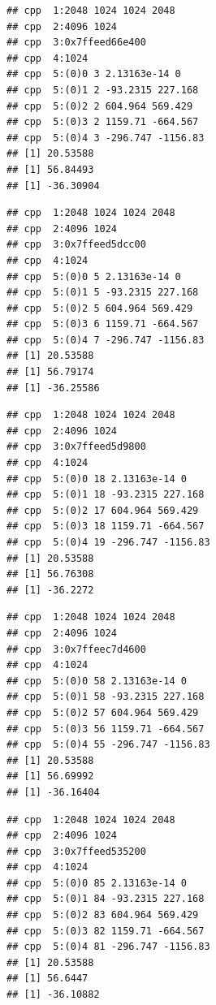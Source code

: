 \documentclass[10pt]{article}\usepackage[]{graphicx}\usepackage[]{color}
\makeatletter
\newenvironment{kframe}{%
 \def\at@end@of@kframe{}%
 \ifinner\ifhmode%
  \def\at@end@of@kframe{\end{minipage}}%
  \begin{minipage}{\columnwidth}%
 \fi\fi%
 \def\FrameCommand##1{\hskip\@totalleftmargin \hskip-\fboxsep
 \colorbox{shadecolor}{##1}\hskip-\fboxsep
     \hskip-\linewidth \hskip-\@totalleftmargin \hskip\columnwidth}%
 \MakeFramed {\advance\hsize-\width
   \@totalleftmargin\z@ \linewidth\hsize
   \@setminipage}}%
 {\par\unskip\endMakeFramed%
 \at@end@of@kframe}
\newenvironment{knitrout}{}{} %
\makeatother
\begin{document}
\begin{knitrout}
\begin{kframe}
{\ttfamily\noindent\itshape\color{messagecolor}{\#\# f creation}}\begin{verbatim}
## cpp  1:2048 1024 1024 2048
## cpp  2:4096 1024
## cpp  3:0x7ffeed66e400
## cpp  4:1024
## cpp  5:(0)0 3 2.13163e-14 0
## cpp  5:(0)1 2 -93.2315 227.168
## cpp  5:(0)2 2 604.964 569.429
## cpp  5:(0)3 2 1159.71 -664.567
## cpp  5:(0)4 3 -296.747 -1156.83
## [1] 20.53588
## [1] 56.84493
## [1] -36.30904
\end{verbatim}


{\ttfamily\noindent\itshape\color{messagecolor}{\#\# Stage\ \ 1 est. (Ave. S.V.R. -11.2 dB) \\\#\# f creation}}\begin{verbatim}
## cpp  1:2048 1024 1024 2048
## cpp  2:4096 1024
## cpp  3:0x7ffeed5dcc00
## cpp  4:1024
## cpp  5:(0)0 5 2.13163e-14 0
## cpp  5:(0)1 5 -93.2315 227.168
## cpp  5:(0)2 5 604.964 569.429
## cpp  5:(0)3 6 1159.71 -664.567
## cpp  5:(0)4 7 -296.747 -1156.83
## [1] 20.53588
## [1] 56.79174
## [1] -36.25586
\end{verbatim}


{\ttfamily\noindent\itshape\color{messagecolor}{\#\# Stage\ \ 2 est. (Ave. S.V.R. -20.4 dB) \\\#\# f creation}}\begin{verbatim}
## cpp  1:2048 1024 1024 2048
## cpp  2:4096 1024
## cpp  3:0x7ffeed5d9800
## cpp  4:1024
## cpp  5:(0)0 18 2.13163e-14 0
## cpp  5:(0)1 18 -93.2315 227.168
## cpp  5:(0)2 17 604.964 569.429
## cpp  5:(0)3 18 1159.71 -664.567
## cpp  5:(0)4 19 -296.747 -1156.83
## [1] 20.53588
## [1] 56.76308
## [1] -36.2272
\end{verbatim}


{\ttfamily\noindent\itshape\color{messagecolor}{\#\# Stage\ \ 3 est. (Ave. S.V.R. -33.3 dB) \\\#\# f creation}}\begin{verbatim}
## cpp  1:2048 1024 1024 2048
## cpp  2:4096 1024
## cpp  3:0x7ffeec7d4600
## cpp  4:1024
## cpp  5:(0)0 58 2.13163e-14 0
## cpp  5:(0)1 58 -93.2315 227.168
## cpp  5:(0)2 57 604.964 569.429
## cpp  5:(0)3 56 1159.71 -664.567
## cpp  5:(0)4 55 -296.747 -1156.83
## [1] 20.53588
## [1] 56.69992
## [1] -36.16404
\end{verbatim}


{\ttfamily\noindent\itshape\color{messagecolor}{\#\# Stage\ \ 4 est. (Ave. S.V.R. -41.6 dB) \\\#\# f creation}}\begin{verbatim}
## cpp  1:2048 1024 1024 2048
## cpp  2:4096 1024
## cpp  3:0x7ffeed535200
## cpp  4:1024
## cpp  5:(0)0 85 2.13163e-14 0
## cpp  5:(0)1 84 -93.2315 227.168
## cpp  5:(0)2 83 604.964 569.429
## cpp  5:(0)3 82 1159.71 -664.567
## cpp  5:(0)4 81 -296.747 -1156.83
## [1] 20.53588
## [1] 56.6447
## [1] -36.10882
\end{verbatim}



\end{kframe}
\end{knitrout}
\end{document}
